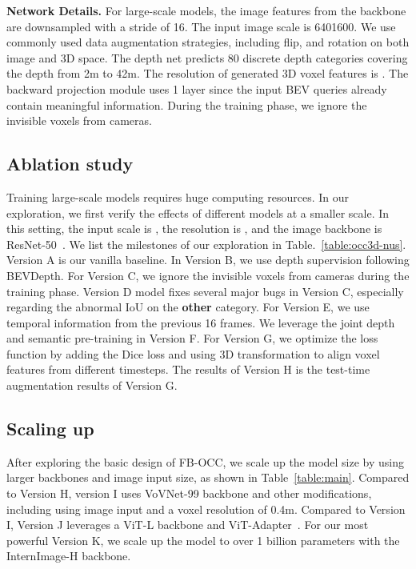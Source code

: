\documentclass[10pt,twocolumn,letterpaper]{article}
\begin{document}
\vspace{2mm}
\noindent\textbf{Network Details.} For large-scale models, the image features from the backbone are downsampled with a stride of 16. The input image scale is 6401600. We use commonly used data augmentation strategies, including flip, and rotation on both image and 3D space. The depth net predicts 80 discrete depth categories covering the depth from 2m to 42m. The resolution of generated 3D voxel features is . The backward projection module uses 1 layer since the input BEV queries already contain meaningful information. During the training phase, we ignore the invisible voxels from cameras.


\subsection{Ablation study}

Training large-scale models requires huge computing resources. In our exploration, we first verify the effects of different models at a smaller scale. In this setting, the input scale is , the resolution is , and the image backbone is ResNet-50~\cite{he2016deep}. We list the milestones of our exploration in Table.~\ref{table:occ3d-nus}.
Version A is our vanilla baseline. In Version B, we use depth supervision following BEVDepth. For Version C, we ignore the invisible voxels from cameras during the training phase. Version D model fixes several major bugs in Version C, especially regarding the abnormal IoU on the \textbf{other} category. For Version E, we use temporal information from the previous 16 frames. We leverage the joint depth and semantic pre-training in Version F. For Version G, we optimize the loss function by adding the Dice loss and using 3D transformation to align voxel features from different timesteps. The results of Version H is the test-time augmentation results of Version G.

\subsection{Scaling up}
After exploring the basic design of FB-OCC, we scale up the model size by using larger backbones and image input size, as shown in Table~\ref{table:main}. Compared to Version H, version I uses VoVNet-99 backbone and other modifications, including using  image input and a voxel resolution of 0.4m. Compared to Version I, Version J leverages a ViT-L backbone and ViT-Adapter~\cite{chen2023vision}. For our most powerful Version K, we scale up the model to over 1 billion parameters with the InternImage-H backbone.
\end{document}
